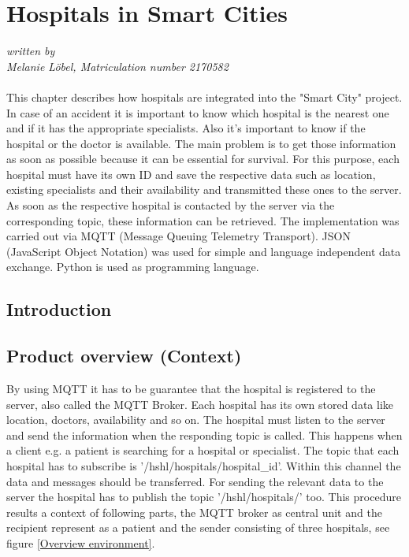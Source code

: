 \chapter{Hospitals in Smart Cities}
\label{abstract} 
\textsl{written by \\ Melanie Löbel, Matriculation number 2170582} \\ 


\abstract
\\This chapter describes how hospitals are integrated into the "Smart City" project.
In case of an accident it is important to know which hospital is the nearest one and if it has the appropriate specialists. Also it’s important to know if the hospital or the doctor is available.
The main problem is to get those information as soon as possible because it can be essential for survival. For this purpose, each hospital must have its own ID and save the respective data such as location, existing specialists and their availability and transmitted these ones to the server. As soon as the respective hospital is contacted by the server via the corresponding topic, these information can be retrieved.
The implementation was carried out via MQTT (Message Queuing Telemetry Transport). JSON (JavaScript Object Notation) was used for simple and language independent data exchange. Python is used as programming language.


\section{Introduction}
\label{sec:1}


\section{Product overview (Context)}
\label{Hospital_Product overview}


By using MQTT it has to be guarantee that the hospital is registered to the server, also called the MQTT Broker. Each hospital has its own stored data like location, doctors, availability and so on. The hospital must listen to the server and send the information when the responding topic is called. This happens when a client e.g. a patient is searching for a hospital or specialist. The topic that each hospital has to subscribe is '/hshl/hospitals/hospital_id'. Within this channel the data and messages should be transferred. For sending the relevant data to the server the hospital has to publish the topic '/hshl/hospitals/' too. This procedure results a context of following parts, the MQTT broker as central unit and the recipient represent as a patient and the sender consisting of three hospitals, see figure \ref{Overview environment}. 

